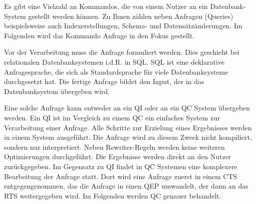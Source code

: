 Es gibt eine Vielzahl an Kommandos, die von einem Nutzer an ein Datenbank-System gestellt werden können. Zu Ihnen zählen neben Anfragen (Queries) beispielsweise auch Indexerstellungen, Schema-  und Datensätzänderungen. Im Folgenden wird das Kommando Anfrage in den Fokus gestellt.

Vor der Verarbeitung muss die Anfrage formuliert werden. Dies geschieht bei relationalen Datenbanksystemen i.d.R. in \ac{SQL}. \ac{SQL} ist eine deklarative Anfragesprache, die sich als Standardsprache für viele Datenbanksysteme durchgesetzt hat. Die fertige Anfrage bildet den Input, der in das Datenbanksystem übergeben wird. 

Eine solche Anfrage kann entweder an ein \ac{QI} oder an ein \ac{QC} System übergeben werden. Ein \ac{QI} ist im Vergleich zu einem \ac{QC} ein einfaches System zur Verarbeitung einer Anfrage. Alle Schritte zur Erzielung eines Ergebnisses werden in einem System ausgeführt. Die Anfrage wird zu diesem Zweck nicht kompiliert, sondern nur interpretiert. Neben Rewriter-Regeln werden keine weiteren Optimierungen durchgeführt. Die Ergebnisse werden direkt an den Nutzer zurückgegeben. Im Gegensatz zu \ac{QI} findet in \ac{QC} Systemen eine komplexere Bearbeitung der Anfrage statt. Dort wird eine Anfrage zuerst in einem \ac{CTS} entgegengenommen, das die Anfrage in einen \ac{QEP} umwandelt, der dann an das \ac{RTS} weitergegeben wird. Im Folgenden werden \ac{QC} genauer behandelt.





